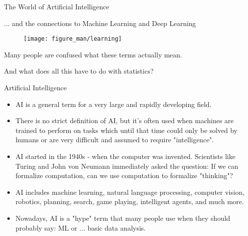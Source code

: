 
\begin{frame}{The World of Artificial Intelligence}

... and the connections to Machine Learning and Deep Learning


\begin{center}

  \begin{figure}
    \texttt{[image: figure\_man/learning]} 
  \end{figure}

  \lz

Many people are confused what these terms actually mean. 

\lz

And what does all this have to do with statistics?


%  
  
  \end{center}
  
\end{frame}


\begin{frame}{Artificial Intelligence}

\begin{itemize}
	\item AI is a general term for a very large and rapidly developing field.
	\item There is no strict definition of AI, but it's often used when machines are trained to perform on tasks which until that time could only be solved by humans or are very difficult and assumed to require "intelligence".
    \item AI started in the 1940s - when the computer was invented. Scientists like 
        Turing and John von Neumann immediately asked the question:
        If we can formalize computation, can we use computation to formalize "thinking"?
	\item AI includes machine learning, natural language processing, computer vision, robotics, planning, search, game playing, intelligent agents, and much more.
    \item Nowadays, AI is a "hype" term that many people use when they should probably say: ML or ... basic data analysis.
\end{itemize}
  
\end{frame}

